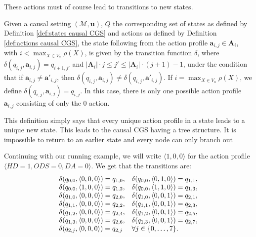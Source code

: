 These actions must of course lead to transitions to new states. 
\begin{definition}\label{def:transitions causal CGS}
    Given a causal setting $(\mathcal{M},\mathbf{u})$, $Q$ the corresponding set of states as defined by Definition \ref{def:states causal CGS} and actions as defined by Definition \ref{def:actions causal CGS}, the state following from the action profile $\mathbf{a}_{i,j} \in \mathbf{A}_i$, with $i < \max_{X\in V_a} \rho(X)$, is given by the transition function $\delta$, where $\delta(q_{i,j},\mathbf{a}_{i,j}) = q_{i+1,j'}$ and $|\mathbf{A}_i| \cdot j \leq j'\leq |\mathbf{A}_i| \cdot (j+1) -1$, under the condition that if $\mathbf{a}_{i,j} \neq \mathbf{a}'_{i,j}$, then $\delta(q_{i,j},\mathbf{a}_{i,j}) \neq \delta(q_{i,j}, \mathbf{a}'_{i,j})$.
    If $i = \max_{X\in V_a} \rho(X)$, we define $\delta(q_{i,j},\mathbf{a}_{i,j}) = q_{i,j}$. In this case, there is only one possible action profile $\mathbf{a}_{i,j}$ consisting of only the $0$ action. 
\end{definition}
This definition simply says that every unique action profile in a state leads to a unique new state. This leads to the causal CGS having a tree structure. It is impossible to return to an earlier state and every node can only branch out
\begin{example}\label{ex:transitions causal CGS}
    Continuing with our running example, we will write $\langle 1, 0, 0 \rangle$ for the action profile $\langle HD = 1, ODS = 0, DA = 0 \rangle$. 
    We get that the transitions are:
    \newline 
    \begin{equation*}
        \begin{array}{ll}
            \delta(q_{0,0}, \langle 0, 0, 0\rangle) = q_{1,0},  & 
            \delta(q_{0,0}, \langle 0, 1, 0\rangle) = q_{1,1}, \\
            \delta(q_{0,0}, \langle 1, 0, 0\rangle) = q_{1,2},  & 
            \delta(q_{0,0}, \langle 1, 1, 0\rangle) = q_{1,3}, \\
            \delta(q_{1,0},\langle 0, 0, 0\rangle) = q_{2,0}, &
            \delta(q_{1,0}, \langle 0, 0, 1\rangle) = q_{2,1}, \\
            \delta(q_{1,1},\langle 0, 0, 0\rangle) = q_{2,2}, &
            \delta(q_{1,1}, \langle 0, 0, 1\rangle) = q_{2,3}, \\
            \delta(q_{1,2},\langle 0, 0, 0\rangle) = q_{2,4}, &
            \delta(q_{1,2}, \langle 0, 0, 1\rangle) = q_{2,5}, \\
            \delta(q_{1,3},\langle 0, 0, 0\rangle) = q_{2,6}, &
            \delta(q_{1,3}, \langle 0, 0, 1\rangle) = q_{2,7}, \\
            \delta(q_{2,j},\langle 0, 0, 0\rangle) = q_{2,j} & \forall j \in \{ {0,\ldots,7} \}.
        \end{array}
    \end{equation*}
\end{example}

